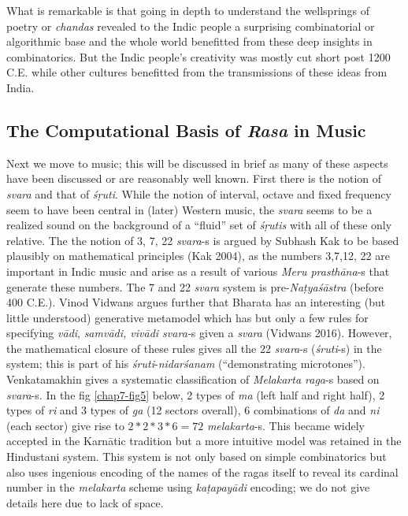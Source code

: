What is remarkable is that going in depth to understand the wellsprings of poetry or \textsl{chandas} revealed to the Indic people a surprising combinatorial or algorithmic base and the whole world benefitted from these deep insights in combinatorics. But the Indic people’s creativity was mostly cut short post 1200 C.E. while other cultures benefitted from the transmissions of these ideas from India.

\subsection{The Computational Basis of \textsl{Rasa} in Music}\label{chap7-sec5.2}

Next we move to music; this will be discussed in brief as many of these aspects have been discussed or are reasonably well known. First there is the notion of \textsl{svara} and that of \textsl{śṛuti}. While the notion of interval, octave and fixed frequency seem to have been central in (later) Western music, the \textsl{svara} seems to be a realized sound on the background of a “fluid” set of \textsl{śṛutis} with all of these only relative. The the notion of 3, 7, 22 \textsl{svara}-s is argued by Subhash Kak to be based plausibly on mathematical principles (Kak 2004), as the numbers 3,7,12, 22 are important in Indic music and arise as a result of various \textsl{Meru prasthāna}-s that generate these numbers. The 7 and 22 \textsl{svara} system is pre-\textsl{Naṭyaśāstra} (before 400 C.E.). Vinod Vidwans argues further that Bharata has an interesting (but little understood) generative metamodel which has but only a few rules for specifying \textsl{vādi}, \textsl{samvādi, vivādi svara-}s given a \textsl{svara} (Vidwans 2016). However, the mathematical closure of these rules gives all the 22 \textsl{svara}-s (\textsl{śruti}-s) in the system; this is part of his \textsl{śruti}-\textsl{nidarśanam} (“demonstrating microtones”). Venkatamakhin gives a systematic classification of \textsl{Melakarta raga}-s based on \textsl{svara}-s. In the fig \ref{chap7-fig5} below, 2 types of \textsl{ma} (left half and right half), 2 types of \textsl{ri} and 3 types of \textsl{ga} (12 sectors overall), 6 combinations of \textsl{da} and \textsl{ni} (each sector) give rise to $2*2*3*6=72$ \textsl{melakarta}-s. This became widely accepted in the Karnātic tradition but a more intuitive model was retained in the Hindustani system. This system is not only based on simple combinatorics but also uses ingenious encoding of the names of the ragas itself to reveal its cardinal number in the \textsl{melakarta} scheme using \textsl{kaṭapayādi} encoding; we do not give details here due to lack of space.
